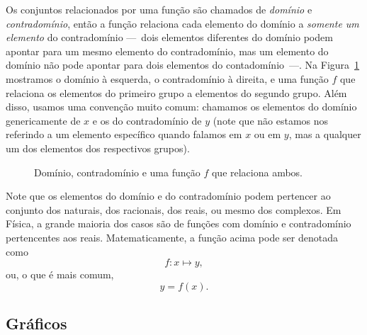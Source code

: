 Os conjuntos relacionados por uma função são chamados de \emph{domínio} e \emph{contradomínio}, então a função relaciona cada elemento do domínio a \emph{somente um elemento} do contradomínio ---~dois elementos diferentes do domínio podem apontar para um mesmo elemento do contradomínio, mas um elemento do domínio não pode apontar para dois elementos do contadomínio~---. Na Figura~\ref{Fig:Funcao} mostramos o domínio à esquerda, o contradomínio à direita, e uma função $f$ que relaciona os elementos do primeiro grupo a elementos do segundo grupo. Além disso, usamos uma convenção muito comum: chamamos os elementos do domínio genericamente de $x$ e os do contradomínio de $y$ (note que não estamos nos referindo a um elemento específico quando falamos em $x$ ou em $y$, mas a qualquer um dos elementos dos respectivos grupos).
\begin{figure}[h]
\centering
{}
\caption{Domínio, contradomínio e uma função $f$ que relaciona ambos.\label{Fig:Funcao}}
\end{figure}

Note que os elementos do domínio e do contradomínio podem pertencer ao conjunto dos naturais, dos racionais, dos reais, ou mesmo dos complexos. Em Física, a grande maioria dos casos são de funções com domínio e contradomínio pertencentes aos reais. Matematicamente, a função acima pode ser denotada como
\begin{equation}
    f: x \mapsto y,
\end{equation}
%
ou, o que é mais comum,
\begin{equation}
    y = f(x).
\end{equation}

\subsection{Gráficos}

